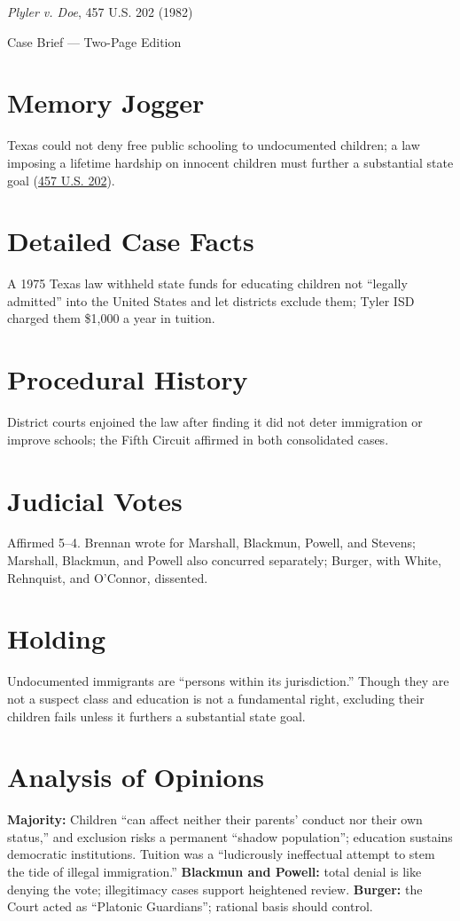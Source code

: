 \documentclass[12pt]{article}
\begin{document}
\begin{center}
{\LARGE \textit{Plyler v. Doe}, 457 U.S. 202 (1982)\par}
\vspace{0.5em}
{\large Case Brief --- Two-Page Edition\par}
\end{center}

\section{Memory Jogger}
Texas could not deny free public schooling to undocumented children; a law imposing a lifetime hardship on innocent children must further a substantial state goal (\href{https://supreme.justia.com/cases/federal/us/457/202/}{457 U.S. 202}).

\section{Detailed Case Facts}
A 1975 Texas law withheld state funds for educating children not ``legally admitted'' into the United States and let districts exclude them; Tyler ISD charged them \$1,000 a year in tuition.

\section{Procedural History}
District courts enjoined the law after finding it did not deter immigration or improve schools; the Fifth Circuit affirmed in both consolidated cases.

\section{Judicial Votes}
Affirmed 5--4. Brennan wrote for Marshall, Blackmun, Powell, and Stevens; Marshall, Blackmun, and Powell also concurred separately; Burger, with White, Rehnquist, and O'Connor, dissented.

\section{Holding}
Undocumented immigrants are ``persons within its jurisdiction.'' Though they are not a suspect class and education is not a fundamental right, excluding their children fails unless it furthers a substantial state goal.

\section{Analysis of Opinions}
\textbf{Majority:} Children ``can affect neither their parents' conduct nor their own status,'' and exclusion risks a permanent ``shadow population''; education sustains democratic institutions. Tuition was a ``ludicrously ineffectual attempt to stem the tide of illegal immigration.'' \textbf{Blackmun and Powell:} total denial is like denying the vote; illegitimacy cases support heightened review. \textbf{Burger:} the Court acted as ``Platonic Guardians''; rational basis should control.
\end{document}
